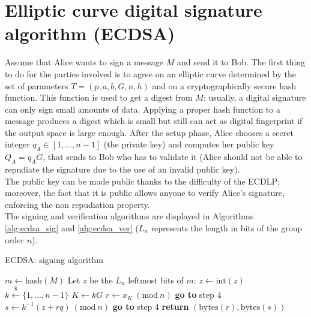\bigskip

\section{Elliptic curve digital signature algorithm (ECDSA)}
\label{ecdsa}
Assume that Alice wants to sign a message $M$ and send it to Bob. The first thing to do for the parties involved is to agree on an elliptic curve determined by the set of parameters $T = (p, a, b, G, n, h)$ and on a cryptographically secure hash function. This function is used to get a digest from $M$: usually, a digital signature can only sign small amounts of data. Applying a proper hash function to a message produces a digest which is small but still can act as digital fingerprint if the output space is large enough. After the setup phase, Alice chooses a secret integer $q_A \in [1, ..., n - 1]$ (the private key) and computes her public key $Q_A = q_AG$, that sends to Bob who has to validate it (Alice should not be able to repudiate the signature due to the use of an invalid public key). 
\\
The public key can be made public thanks to the difficulty of the ECDLP; moreover, the fact that it is public allows anyone to verify Alice's signature, enforcing the non repudiation property.
\\
The signing and verification algorithms are displayed in Algorithms \ref{alg:ecdsa_sig} and \ref{alg:ecdsa_ver} ($L_n$ represents the length in bits of the group order $n$).

\bigskip

\begin{algorithm}
	\caption{ECDSA: signing algorithm}
	\label{alg:ecdsa_sig}
	\begin{algorithmic}[1]
		\State $m \gets \text{hash}(M)$
		\State Let $z$ be the $L_n$ leftmost bits of $m$: $z \gets \text{int}(z)$
		\State $k \xleftarrow{\text{\$}} \{1, ..., n - 1\}$
		\State $K \gets kG$
		\State $r \gets x_K \ (\text{mod} \ n)$
		\State \textbf{go to} step 4
		\EndIf 
		\State $s \gets k^{-1}(z + rq) \ (\text{mod} \ n)$
		\State \textbf{go to} step 4
		\EndIf
		\State \textbf{return} $(\text{bytes}(r), \text{bytes}(s))$
		\EndProcedure
	\end{algorithmic}
\end{algorithm}

\bigskip

